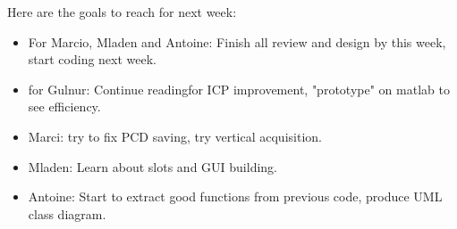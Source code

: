 \documentclass[aps,letterpaper,11pt]{revtex4}
\begin{document}
Here are the goals to reach for next week:

\begin{itemize}
\item For Marcio, Mladen and Antoine: Finish all review and design by this week, start coding next week.
\item for Gulnur: Continue readingfor ICP improvement, "prototype" on matlab to see efficiency.
\item Marci: try to fix PCD saving, try vertical acquisition.
\item Mladen: Learn about slots and GUI building.
\item Antoine: Start to extract good functions from previous code, produce UML class diagram.
\end{itemize}
\end{document}
